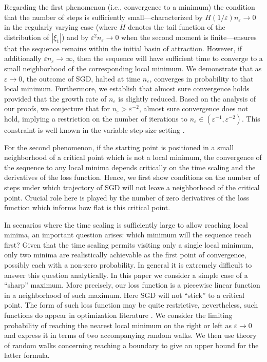 \documentclass{article}
\theoremstyle{plain}
\theoremstyle{definition}
\theoremstyle{remark}
\begin{document}
Regarding the first phenomenon (i.e., convergence to a minimum) the condition that the number of steps is sufficiently small---characterized by $H(1/\varepsilon) n_\varepsilon \rightarrow 0$ in the regularly varying case (where $H$ denotes the tail function of the distribution of $|\xi_1|$) and by $\varepsilon^2 n_\varepsilon \rightarrow 0$ when the second moment is finite---ensures that the sequence remains within the initial basin of attraction.
%
However, if additionally $\varepsilon n_\varepsilon \rightarrow \infty$, then the sequence will have sufficient time to converge to a small neighborhood of the corresponding local minimum. We demonstrate that as $\varepsilon \rightarrow 0$, the outcome of SGD, halted at time $n_\varepsilon$, converges in probability to that local minimum. 
%
Furthermore, we establish that almost sure convergence holds provided that the growth rate of $n_{\varepsilon}$ is slightly reduced. Based on the analysis of our proofs, we conjecture that for $n_{\varepsilon}>\varepsilon^{-2}$, almost sure convergence does not hold, implying a restriction on the number of iterations to $n_{\varepsilon} \in (\varepsilon^{-1},\varepsilon^{-2})$. This constraint is well-known in the variable step-size setting \citep{RobbinsMonro1951}.

For the second phenomenon, if the starting point is positioned in a small neighborhood of a critical point which is not a local minimum, the convergence of the sequence to any local minima depends critically on the time scaling and the derivatives of the loss function. Hence, we first show conditions on the number of steps under which trajectory of SGD will not leave a neighborhood of the critical point. Crucial role  here is played by the number of zero derivatives of the loss function which informs how flat is this critical point.

In scenarios where the time scaling is sufficiently large to allow reaching local minima, an important question arises: which minimum will the sequence reach first? Given that the time scaling permits visiting only a single local minimum, only two minima are realistically achievable as the first point of convergence, possibly each with a non-zero probability. In general it is extremely difficult to answer this question analytically. In this paper we consider a simple case of a ``sharp'' maximum. More precisely, our loss function is a piecewise linear function in a neighborhood of such maximum. Here SGD will not ``stick'' to a critical point. The form of such loss function may be quite restrictive, nevertheless, such functions do appear in optimization literature \cite{leenaerts2013piecewise}. We consider the limiting probability of reaching the nearest local minimum on the right or left as $\varepsilon\to 0$
 and express it in terms of two accompanying random walks. We then use theory of random walks concerning reaching a boundary to give an upper bound for the latter formula.
\end{document}
